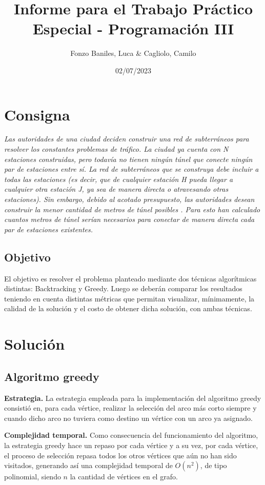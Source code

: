 \documentclass[10 pt, A4paper]{article}
\title{Informe para el Trabajo Práctico Especial - Programación III}
\author{Fonzo Baniles, Luca \& Cagliolo, Camilo}
\date{02/07/2023}
\begin{document}
	\maketitle
	\section*{Consigna}
	\begin{displayquote}
		\textit{Las autoridades de una ciudad deciden construir una red de subterráneos para resolver los constantes problemas de tráfico. La ciudad ya cuenta con N estaciones construidas, pero todavía no tienen ningún túnel que conecte ningún par de estaciones entre sí. La red de subterráneos que se construya debe incluir a todas las estaciones (es decir, que de cualquier estación H pueda llegar a cualquier otra estación J, ya sea de manera directa o atravesando otras estaciones). Sin embargo, debido al acotado presupuesto, las autoridades desean construir la menor cantidad de metros de túnel posibles . Para esto han calculado cuantos metros de túnel serían necesarios para conectar de manera directa cada par de estaciones existentes.}
	\end{displayquote}
	\subsection*{Objetivo}
	El objetivo es resolver el problema planteado mediante dos técnicas algorítmicas distintas: Backtracking y Greedy. Luego se deberán comparar los resultados teniendo en cuenta distintas métricas que permitan visualizar, mínimamente, la calidad de la solución y el costo de obtener dicha solución, con ambas técnicas.
	\section*{Solución}
	\subsection*{Algoritmo greedy}
	
	\textbf{Estrategia.} La estrategia empleada para la implementación del algoritmo greedy consistió en, para cada vértice, realizar la selección del arco más corto siempre y cuando dicho arco no tuviera como destino un vértice con un arco ya asignado.
	
	\textbf{Complejidad temporal.} Como consecuencia del funcionamiento del algoritmo, la estrategia greedy hace un repaso por cada vértice y a su vez, por cada vértice, el proceso de selección repasa todos los otros vértices que aún no han sido visitados, generando así una complejidad temporal de $O(n^2)$, de tipo polinomial, siendo $n$ la cantidad de vértices en el grafo.
	
\end{document}
